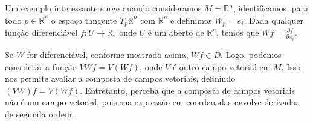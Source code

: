 Um exemplo interessante surge quando consideramos $M=\mathbb{R}^{n}$, identificamos, para todo $p \in \mathbb{R}^{n}$ o espaço tangente $T_{p}\mathbb{R}^{n}$ com $\mathbb{R}^{n}$ e definimos $W_{p}=e_{i}$. Dada qualquer função diferenciável $f:U\to \mathbb{R},$ onde $U$ é um aberto de $\mathbb{R}^{n}$, temos que $Wf=\frac{\partial f}{\partial x_{i}}$.

Se $W$ for diferenciável, conforme mostrado acima, $Wf \in D$. Logo, podemos considerar a
função $VWf = V (Wf)$, onde $V$ é outro campo vetorial em $M$. Isso nos permite avaliar a
composta de campos vetoriais, definindo $(VW)f = V (Wf)$. Entretanto, perceba que a
composta de campos vetoriais não é um campo vetorial, pois sua expressão em
coordenadas envolve derivadas de segunda ordem.

